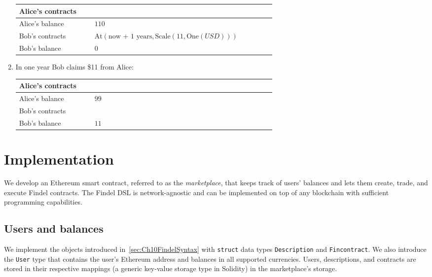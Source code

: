 \begin{enumerate}
	\begin{tabular}{| p{0.25\linewidth} | p{0.60\linewidth} |}
		\hline
		Alice's contracts & \\
		\hline
		Alice's balance & $110$ \\
		\hline
		Bob's contracts & \(\mathrm{At}(\text{now + 1 years},\mathrm{Scale}(11,\mathrm{One}(USD)))\) \\
		\hline
		Bob's balance & $0$ \\
		\hline    
	\end{tabular}
	
	\item In one year Bob claims \$11 from Alice:
	
	\begin{tabular}{| p{0.25\linewidth} | p{0.60\linewidth} |}
		\hline
		Alice's contracts & \\
		\hline
		Alice's balance & $99$ \\
		\hline
		Bob's contracts & \\
		\hline
		Bob's balance & $11$ \\
		\hline    
	\end{tabular}
	
\end{enumerate}




\section{Implementation} \label{sec:Ch10FindelImplementation}

We develop an Ethereum smart contract, referred to as the \textit{marketplace}, that keeps track of users' balances and lets them create, trade, and execute Findel contracts.
The Findel DSL is network-agnostic and can be implemented on top of any blockchain with sufficient programming capabilities.


\subsection{Users and balances}

We implement the objects introduced in~\ref{sec:Ch10FindelSyntax} with \texttt{struct} data types \texttt{Description} and \texttt{Fincontract}.
We also introduce the \texttt{User} type that contains the user's Ethereum address and balances in all supported currencies.
Users, descriptions, and contracts are stored in their respective mappings (a generic key-value storage type in Solidity) in the marketplace's storage.

